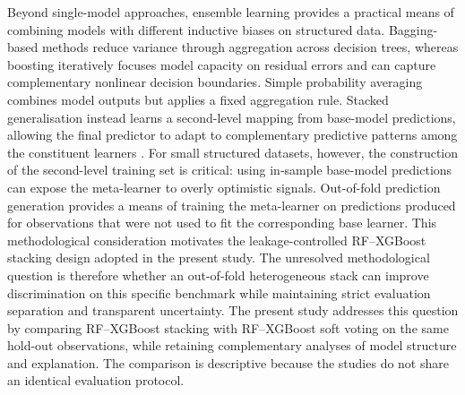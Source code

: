 \documentclass[a4paper,fleqn]{cas-dc}
\begin{document}
Beyond single-model approaches, ensemble learning provides a practical means of combining models with different inductive biases on structured data. Bagging-based methods reduce variance through aggregation across decision trees, whereas boosting iteratively focuses model capacity on residual errors and can capture complementary nonlinear decision boundaries. Simple probability averaging combines model outputs but applies a fixed aggregation rule. Stacked generalisation instead learns a second-level mapping from base-model predictions, allowing the final predictor to adapt to complementary predictive patterns among the constituent learners \cite{wolpert1992}. For small structured datasets, however, the construction of the second-level training set is critical: using in-sample base-model predictions can expose the meta-learner to overly optimistic signals. Out-of-fold prediction generation provides a means of training the meta-learner on predictions produced for observations that were not used to fit the corresponding base learner. This methodological consideration motivates the leakage-controlled RF--XGBoost stacking design adopted in the present study. The unresolved methodological question is therefore whether an out-of-fold heterogeneous stack can improve discrimination on this specific benchmark while maintaining strict evaluation separation and transparent uncertainty. The present study addresses this question by comparing RF--XGBoost stacking with RF--XGBoost soft voting on the same hold-out observations, while retaining complementary analyses of model structure and explanation. The comparison is descriptive because the studies do not share an identical evaluation protocol.
\end{document}
